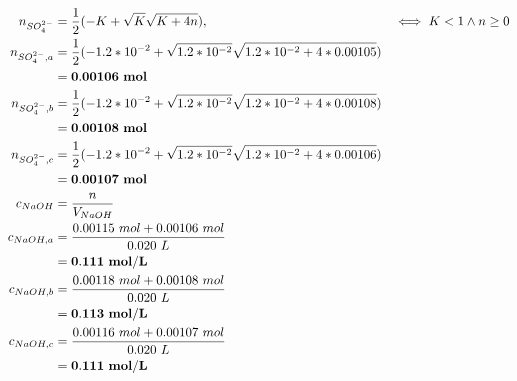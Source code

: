 \documentclass[10pt,twoside]{report}
\begin{document}
\begin{equation*}
    \begin{split}
        n_{SO_4^{2-}} &= \frac{1}{2}(-K + \sqrt{K}\sqrt{K + 4n}), & \iff K < 1 \wedge n \geq 0 \\
        n_{SO_4^{2-},a} &= \frac{1}{2}(-1.2*10^{-2} + \sqrt{1.2*10^{-2}}\sqrt{1.2*10^{-2} + 4*0.00105})\\
            &= \bold{0.00106\ mol}\\
        n_{SO_4^{2-},b} &= \frac{1}{2}(-1.2*10^{-2} + \sqrt{1.2*10^{-2}}\sqrt{1.2*10^{-2} + 4*0.00108})\\
            &= \bold{0.00108\ mol}\\
        n_{SO_4^{2-},c} &= \frac{1}{2}(-1.2*10^{-2} + \sqrt{1.2*10^{-2}}\sqrt{1.2*10^{-2} + 4*0.00106})\\
            &= \bold{0.00107\ mol}\\
        c_{NaOH} &= \frac{n}{V_{NaOH}}\\
        c_{NaOH,a}  &= \frac{0.00115\ mol + 0.00106\ mol}{0.020\ L}\\
            &= \bold{0.111\ mol/L}\\
        c_{NaOH,b}  &= \frac{0.00118\ mol + 0.00108\ mol}{0.020\ L}\\
            &= \bold{0.113\ mol/L}\\
        c_{NaOH,c} &= \frac{0.00116\ mol + 0.00107\ mol}{0.020\ L}\\
            &= \bold{0.111\ mol/L}\\
    \end{split}
\end{equation*}

\newpage
\end{document}
